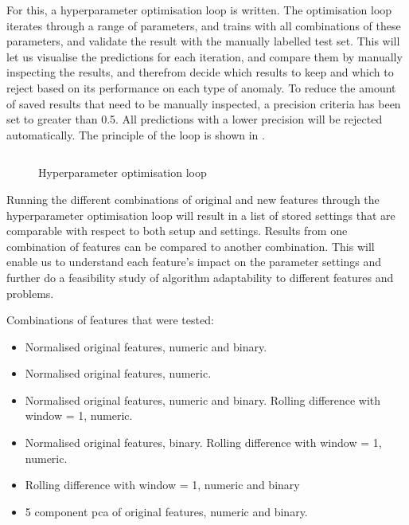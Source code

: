 \documentclass[english, a4paper]{report}
\begin{document}
{{{{                For this, a hyperparameter optimisation loop is written. The optimisation loop iterates through a range of parameters, and trains with all combinations of these parameters, and validate the result with the manually labelled test set. This will let us visualise the predictions for each iteration, and compare them by manually inspecting the results, and therefrom decide which results to keep and which to reject based on its performance on each type of anomaly. To reduce the amount of saved results that need to be manually inspected, a precision criteria has been set to greater than 0.5. All predictions with a lower precision will be rejected automatically. The principle of the loop is shown in .
                                
                \begin{figure}[H]
                    \centering {} \inputminted{python}{thesis/Code/for_code.py}
                    \caption{Hyperparameter optimisation loop}
                    \label{fig:optLoop}
                \end{figure}
                
                \par
                Running the different combinations of original and new features through the hyperparameter optimisation loop will result in a list of stored settings that are comparable with respect to both setup and settings. Results from one combination of features can be compared to another combination. This will enable us to understand each feature's impact on the parameter settings and further do a feasibility study of algorithm adaptability to different features and problems.
               \par
               Combinations of features that were tested:
               
               \begin{itemize}
                   \item Normalised original features, numeric and binary.
                   \item Normalised original features, numeric.
                   \item Normalised original features, numeric and binary. Rolling difference with window = 1, numeric.
                   \item Normalised original features, binary. Rolling difference with window = 1, numeric.
                   \item Rolling difference with window = 1, numeric and binary
                   \item 5 component \gls{pca} of original features, numeric and binary.
               \end{itemize}
            }
        }
        
}}
\end{document}
